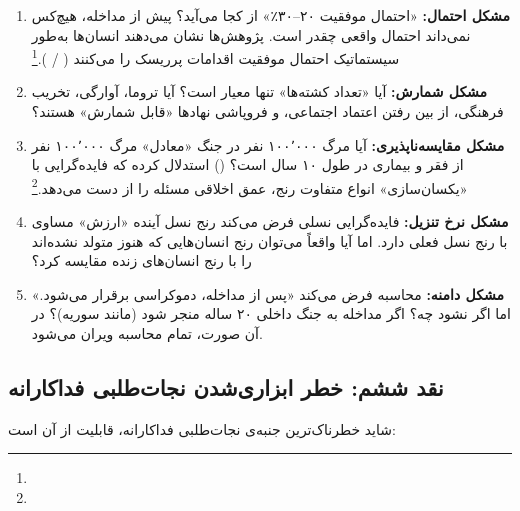 \begin{tcolorbox}[wavebox, title={پنج مشکل با محاسبه‌ی فایده‌گرایانه}]
\begin{enumerate}
\item \textbf{مشکل احتمال:} «احتمال موفقیت ۲۰–۳۰٪» از کجا می‌آید؟ پیش از مداخله، هیچ‌کس نمی‌داند احتمال واقعی چقدر است. پژوهش‌ها نشان می‌دهند انسان‌ها به‌طور سیستماتیک احتمال موفقیت اقدامات پرریسک را  می‌کنند ( / ).\footnote{}

\item \textbf{مشکل شمارش:} آیا «تعداد کشته‌ها» تنها معیار است؟ آیا تروما، آوارگی، تخریب فرهنگی، از بین رفتن اعتماد اجتماعی، و فروپاشی نهادها «قابل شمارش» هستند؟

\item \textbf{مشکل مقایسه‌ناپذیری:} آیا مرگ ۱۰۰٬۰۰۰ نفر در جنگ «معادل» مرگ ۱۰۰٬۰۰۰ نفر از فقر و بیماری در طول ۱۰ سال است؟  () استدلال کرده که فایده‌گرایی با «یکسان‌سازی» انواع متفاوت رنج، عمق اخلاقی مسئله را از دست می‌دهد.\footnote{}

\item \textbf{مشکل نرخ تنزیل:} فایده‌گرایی نسلی فرض می‌کند رنج نسل آینده «ارزش» مساوی با رنج نسل فعلی دارد. اما آیا واقعاً می‌توان رنج انسان‌هایی که هنوز متولد نشده‌اند را با رنج انسان‌های زنده مقایسه کرد؟

\item \textbf{مشکل دامنه:} محاسبه فرض می‌کند «پس از مداخله، دموکراسی برقرار می‌شود.» اما اگر نشود چه؟ اگر مداخله به جنگ داخلی ۲۰ ساله منجر شود (مانند سوریه)؟ در آن صورت، تمام محاسبه ویران می‌شود.
\end{enumerate}
\end{tcolorbox}


\subsection{نقد ششم: خطر ابزاری‌شدن نجات‌طلبی فداکارانه}
\label{subsec:ch15-critique-instrumentalization}

شاید خطرناک‌ترین جنبه‌ی نجات‌طلبی فداکارانه، قابلیت  از آن است:


